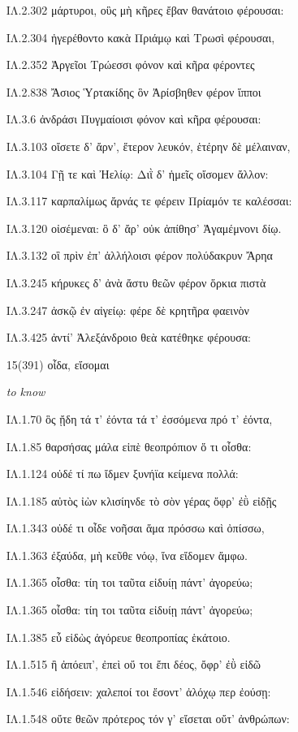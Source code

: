 \begin{enumerate}
{ΙΛ.2.302 μάρτυροι, οὓς μὴ κῆρες ἔβαν θανάτοιο φέρουσαι:

ΙΛ.2.304 ἠγερέθοντο κακὰ Πριάμῳ καὶ Τρωσὶ φέρουσαι,

ΙΛ.2.352 Ἀργεῖοι Τρώεσσι φόνον καὶ κῆρα φέροντες

ΙΛ.2.838 Ἄσιος Ὑρτακίδης ὃν Ἀρίσβηθεν φέρον ἵπποι

ΙΛ.3.6 ἀνδράσι Πυγμαίοισι φόνον καὶ κῆρα φέρουσαι:

ΙΛ.3.103 οἴσετε δ' ἄρν', ἕτερον λευκόν, ἑτέρην δὲ μέλαιναν,

ΙΛ.3.104 Γῇ τε καὶ Ἠελίῳ: Διῒ δ' ἡμεῖς οἴσομεν ἄλλον:

ΙΛ.3.117 καρπαλίμως ἄρνάς τε φέρειν Πρίαμόν τε καλέσσαι:

ΙΛ.3.120 οἰσέμεναι: ὃ δ' ἄρ' οὐκ ἀπίθησ' Ἀγαμέμνονι δίῳ.

ΙΛ.3.132 οἳ πρὶν ἐπ' ἀλλήλοισι φέρον πολύδακρυν Ἄρηα

ΙΛ.3.245 κήρυκες δ' ἀνὰ ἄστυ θεῶν φέρον ὅρκια πιστὰ

ΙΛ.3.247 ἀσκῷ ἐν αἰγείῳ: φέρε δὲ κρητῆρα φαεινὸν

ΙΛ.3.425 ἀντί' Ἀλεξάνδροιο θεὰ κατέθηκε φέρουσα:

}

\clearpage
\item[\large 15(391)]{\large \g οἶδα, εἴσομαι  }

\hspace{0.2cm} \textit{  to know }

{\g
ΙΛ.1.70 ὃς ᾔδη τά τ' ἐόντα τά τ' ἐσσόμενα πρό τ' ἐόντα,

ΙΛ.1.85 θαρσήσας μάλα εἰπὲ θεοπρόπιον ὅ τι οἶσθα:

ΙΛ.1.124 οὐδέ τί πω ἴδμεν ξυνήϊα κείμενα πολλά:

ΙΛ.1.185 αὐτὸς ἰὼν κλισίηνδε τὸ σὸν γέρας ὄφρ' ἐῢ εἰδῇς

ΙΛ.1.343 οὐδέ τι οἶδε νοῆσαι ἅμα πρόσσω καὶ ὀπίσσω,

ΙΛ.1.363 ἐξαύδα, μὴ κεῦθε νόῳ, ἵνα εἴδομεν ἄμφω.

ΙΛ.1.365 οἶσθα: τίη τοι ταῦτα εἰδυίῃ πάντ' ἀγορεύω;

ΙΛ.1.365 οἶσθα: τίη τοι ταῦτα εἰδυίῃ πάντ' ἀγορεύω;

ΙΛ.1.385 εὖ εἰδὼς ἀγόρευε θεοπροπίας ἑκάτοιο.

ΙΛ.1.515 ἢ ἀπόειπ', ἐπεὶ οὔ τοι ἔπι δέος, ὄφρ' ἐῢ εἰδῶ

ΙΛ.1.546 εἰδήσειν: χαλεποί τοι ἔσοντ' ἀλόχῳ περ ἐούσῃ:

ΙΛ.1.548 οὔτε θεῶν πρότερος τόν γ' εἴσεται οὔτ' ἀνθρώπων:

}
\end{enumerate}
